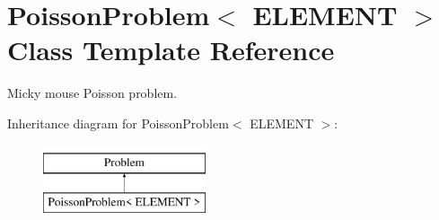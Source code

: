 \hypertarget{classPoissonProblem}{}\section{Poisson\+Problem$<$ E\+L\+E\+M\+E\+NT $>$ Class Template Reference}
\label{classPoissonProblem}


Micky mouse Poisson problem.  


Inheritance diagram for Poisson\+Problem$<$ E\+L\+E\+M\+E\+NT $>$\+:\begin{figure}[H]
\begin{center}
\leavevmode
\includegraphics[height=2.000000cm]{classPoissonProblem}
\end{center}
\end{figure}
